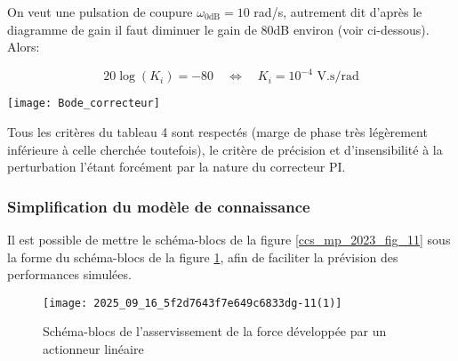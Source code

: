 \ifprof
\begin{corrige}
On veut une pulsation de coupure $\omega_{0\text{dB}} = 10$ rad/s, autrement dit d'après le diagramme de gain il faut diminuer le gain de 80dB environ (voir ci-dessous). Alors:

$$ 20\log(K_i) = -80 \quad \Leftrightarrow \quad \boxed{K_i = 10^{-4} \text{ V.s/rad}} $$

\begin{center}
\texttt{[image: Bode\_correcteur]}
\end{center}

Tous les critères du tableau 4 sont respectés (marge de phase très légèrement inférieure à celle cherchée toutefois), le critère de précision et d'insensibilité à la perturbation l'étant forcément par la nature du correcteur PI.\\



\end{corrige}
\else
\fi



\subsubsection{Simplification du modèle de connaissance}%
\ifprof
\else

Il est possible de mettre le schéma-blocs de la figure \ref{ccs_mp_2023_fig_11} sous la forme du schéma-blocs de la figure \ref{ccs_mp_2023_fig_14}, afin de faciliter la prévision des performances simulées.



\begin{figure}[!h]
\centering
\texttt{[image: 2025\_09\_16\_5f2d7643f7e649c6833dg-11(1)]}
\caption{\label{ccs_mp_2023_fig_14} Schéma-blocs de l'asservissement de la force développée par un actionneur linéaire }
\end{figure}
\fi



